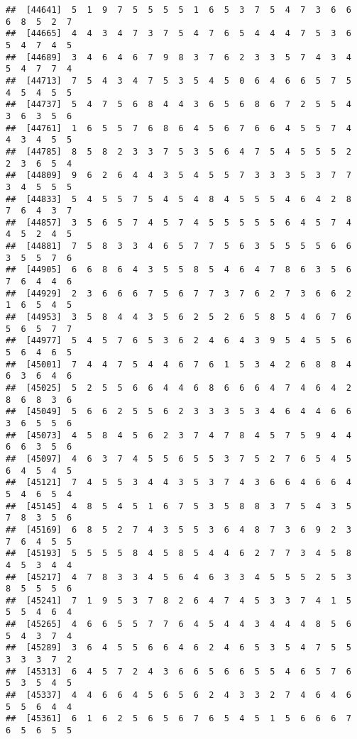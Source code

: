 \documentclass[
]{book}
\begin{document}
\begin{verbatim}
##  [44641]  5  1  9  7  5  5  5  5  1  6  5  3  7  5  4  7  3  6  6  6  8  5  2  7
##  [44665]  4  4  3  4  7  3  7  5  4  7  6  5  4  4  4  7  5  3  6  5  4  7  4  5
##  [44689]  3  4  6  4  6  7  9  8  3  7  6  2  3  3  5  7  4  3  4  5  4  7  7  4
##  [44713]  7  5  4  3  4  7  5  3  5  4  5  0  6  4  6  6  5  7  5  4  5  4  5  5
##  [44737]  5  4  7  5  6  8  4  4  3  6  5  6  8  6  7  2  5  5  4  3  6  3  5  6
##  [44761]  1  6  5  5  7  6  8  6  4  5  6  7  6  6  4  5  5  7  4  4  3  4  5  5
##  [44785]  8  5  8  2  3  3  7  5  3  5  6  4  7  5  4  5  5  5  2  2  3  6  5  4
##  [44809]  9  6  2  6  4  4  3  5  4  5  5  7  3  3  3  5  3  7  7  3  4  5  5  5
##  [44833]  5  4  5  5  7  5  4  5  4  8  4  5  5  5  4  6  4  2  8  7  6  4  3  7
##  [44857]  3  5  6  5  7  4  5  7  4  5  5  5  5  5  6  4  5  7  4  4  5  2  4  5
##  [44881]  7  5  8  3  3  4  6  5  7  7  5  6  3  5  5  5  5  6  6  3  5  5  7  6
##  [44905]  6  6  8  6  4  3  5  5  8  5  4  6  4  7  8  6  3  5  6  7  6  4  4  6
##  [44929]  2  3  6  6  6  7  5  6  7  7  3  7  6  2  7  3  6  6  2  1  6  5  4  5
##  [44953]  3  5  8  4  4  3  5  6  2  5  2  6  5  8  5  4  6  7  6  5  6  5  7  7
##  [44977]  5  4  5  7  6  5  3  6  2  4  6  4  3  9  5  4  5  5  6  5  6  4  6  5
##  [45001]  7  4  4  7  5  4  4  6  7  6  1  5  3  4  2  6  8  8  4  6  3  6  4  6
##  [45025]  5  2  5  5  6  6  4  4  6  8  6  6  6  4  7  4  6  4  2  8  6  8  3  6
##  [45049]  5  6  6  2  5  5  6  2  3  3  3  5  3  4  6  4  4  6  6  3  6  5  5  6
##  [45073]  4  5  8  4  5  6  2  3  7  4  7  8  4  5  7  5  9  4  4  6  6  3  5  6
##  [45097]  4  6  3  7  4  5  5  6  5  5  3  7  5  2  7  6  5  4  5  6  4  5  4  5
##  [45121]  7  4  5  5  3  4  4  3  5  3  7  4  3  6  6  4  6  6  4  5  4  6  5  4
##  [45145]  4  8  5  4  5  1  6  7  5  3  5  8  8  3  7  5  4  3  5  7  8  3  5  6
##  [45169]  6  8  5  2  7  4  3  5  5  3  6  4  8  7  3  6  9  2  3  7  6  4  5  5
##  [45193]  5  5  5  5  8  4  5  8  5  4  4  6  2  7  7  3  4  5  8  4  5  3  4  4
##  [45217]  4  7  8  3  3  4  5  6  4  6  3  3  4  5  5  5  2  5  3  8  5  5  5  6
##  [45241]  7  1  9  5  3  7  8  2  6  4  7  4  5  3  3  7  4  1  5  5  5  4  6  4
##  [45265]  4  6  6  5  5  7  7  6  4  5  4  4  3  4  4  4  8  5  6  5  4  3  7  4
##  [45289]  3  6  4  5  5  6  6  4  6  2  4  6  5  3  5  4  7  5  5  3  3  3  7  2
##  [45313]  6  4  5  7  2  4  3  6  6  5  6  6  5  5  4  6  5  7  6  5  3  5  4  5
##  [45337]  4  4  6  6  4  5  6  5  6  2  4  3  3  2  7  4  6  4  6  5  5  6  4  4
##  [45361]  6  1  6  2  5  6  5  6  7  6  5  4  5  1  5  6  6  6  7  6  5  6  5  5

\end{verbatim}
\end{document}
